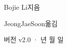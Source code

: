 \begin{titlepage}
\vfill
{\LARGE\sffamily Bojie Li\quad 지음\par}
\vspace{0.35cm}
{\large\sffamily\color{structurecolor} JeongJaeSoon\quad 옮김\par}
\vspace{0.7cm}
{\small\sffamily\color{structurecolor!80} 버전 v2.0 · \number\year 년 \number\month 월 \number\day 일\par}
\vspace{1.2cm}
\end{titlepage}
